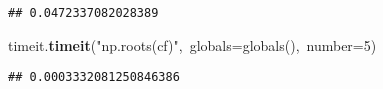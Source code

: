 \documentclass{article}\usepackage[]{graphicx}\usepackage[dvipsnames,table]{xcolor}
\makeatletter
\newcommand{\hlnum}[1]{\textcolor[rgb]{0.686,0.059,0.569}{#1}}%
\newcommand{\hlsng}[1]{\textcolor[rgb]{0.192,0.494,0.8}{#1}}%
\newcommand{\hlopt}[1]{\textcolor[rgb]{0,0,0}{#1}}%
\newcommand{\hldef}[1]{\textcolor[rgb]{0.345,0.345,0.345}{#1}}%
\newcommand{\hlkwb}[1]{\textcolor[rgb]{0.69,0.353,0.396}{#1}}%
\newcommand{\hlkwd}[1]{\textcolor[rgb]{0.737,0.353,0.396}{\textbf{#1}}}%
\newenvironment{kframe}{%
 \def\at@end@of@kframe{}%
 \ifinner\ifhmode%
  \def\at@end@of@kframe{\end{minipage}}%
  \begin{minipage}{\columnwidth}%
 \fi\fi%
 \def\FrameCommand##1{\hskip\@totalleftmargin \hskip-\fboxsep
 \colorbox{shadecolor}{##1}\hskip-\fboxsep
     \hskip-\linewidth \hskip-\@totalleftmargin \hskip\columnwidth}%
 \MakeFramed {\advance\hsize-\width
   \@totalleftmargin\z@ \linewidth\hsize
   \@setminipage}}%
 {\par\unskip\endMakeFramed%
 \at@end@of@kframe}
\newenvironment{knitrout}{}{} %
\makeatother
\begin{document}
\begin{center}
\begin{minipage}[m]{18cm}
\begin{knitrout}
\begin{kframe}
\mbox{}
\normalfont
\begin{verbatim}
## 0.0472337082028389
\end{verbatim}
\noindent
\ttfamily
\hldef{timeit}\hlopt{.}\hldef{}\hlkwd{timeit}\hldef{}\hlopt{(}\hldef{}\hlsng{"np.roots(cf)"}\hldef{}\hlopt{,\ }\hldef{}\hlkwb{globals}\hldef{}\hlopt{=}\hldef{}\hlkwb{globals}\hldef{}\hlopt{(),\ }\hldef{number}\hlopt{=}\hldef{}\hlnum{5}\hldef{}\hlopt{)}\hldef{}\hspace*{\fill}
\mbox{}
\normalfont
\begin{verbatim}
## 0.0003332081250846386
\end{verbatim}
\end{kframe}
\end{knitrout}
\end{minipage}
\end{center}

\newpage
\end{document}
